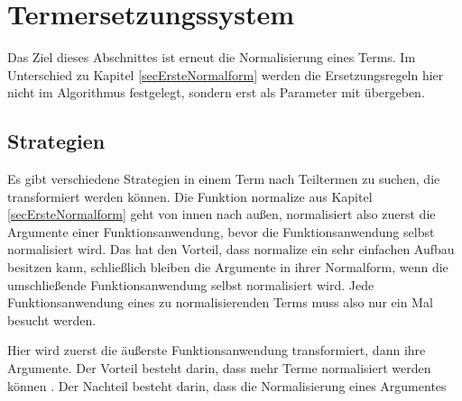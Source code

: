 



\section{Termersetzungssystem} \label{secTermersetzungssystem}

Das Ziel dieses Abschnittes ist erneut die Normalisierung eines Terms. Im Unterschied zu Kapitel \ref{secErsteNormalform} werden die Ersetzungsregeln hier nicht im Algorithmus festgelegt, sondern erst als Parameter mit übergeben.

\subsection{Strategien}
Es gibt verschiedene Strategien in einem Term nach Teiltermen zu suchen, die transformiert werden können. Die Funktion $\mathrm{normalize}$ aus Kapitel \ref{secErsteNormalform} geht von innen nach außen, normalisiert also zuerst die Argumente einer Funktionsanwendung, bevor die Funktionsanwendung selbst normalisiert wird. Das hat den Vorteil, dass $\mathrm{normalize}$ ein sehr einfachen Aufbau besitzen kann, schließlich bleiben die Argumente in ihrer Normalform, wenn die umschließende Funktionsanwendung selbst normalisiert wird. Jede Funktionsanwendung eines zu normalisierenden Terms muss also nur ein Mal besucht werden.


Hier wird zuerst die äußerste Funktionsanwendung transformiert, dann ihre Argumente. Der Vorteil besteht darin, dass mehr Terme normalisiert werden können \cite{EvalStrategien}. Der Nachteil besteht darin, dass die Normalisierung eines Argumentes 

